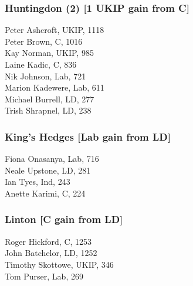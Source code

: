 \documentclass[a4paper,openany,10pt]{book}
\begin{document}
\subsubsection*{Huntingdon (2) \hspace*{\fill}\nolinebreak[1]%
\enspace\hspace*{\fill}
[1 UKIP gain from C]}



Peter Ashcroft, UKIP, 1118\\
Peter Brown, C, 1016\\
Kay Norman, UKIP, 985\\
Laine Kadic, C, 836\\
Nik Johnson, Lab, 721\\
Marion Kadewere, Lab, 611\\
Michael Burrell, LD, 277\\
Trish Shrapnel, LD, 238\\


\subsubsection*{King's Hedges \hspace*{\fill}\nolinebreak[1]%
\enspace\hspace*{\fill}
[Lab gain from LD]}



Fiona Onasanya, Lab, 716\\
Neale Upstone, LD, 281\\
Ian Tyes, Ind, 243\\
Anette Karimi, C, 224\\


\subsubsection*{Linton \hspace*{\fill}\nolinebreak[1]%
\enspace\hspace*{\fill}
[C gain from LD]}



Roger Hickford, C, 1253\\
John Batchelor, LD, 1252\\
Timothy Skottowe, UKIP, 346\\
Tom Purser, Lab, 269\\
\end{document}
